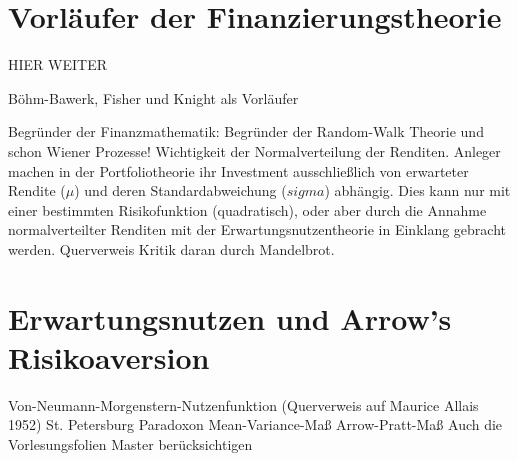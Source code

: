 \section{Vorläufer der Finanzierungstheorie}
\label{FisherundKnight}

HIER WEITER

Böhm-Bawerk, Fisher und Knight als Vorläufer

Begründer der Finanzmathematik: \textcite{Bachelier1900} Begründer der Random-Walk Theorie und schon Wiener Prozesse! 
Wichtigkeit der Normalverteilung der Renditen. Anleger machen in der Portfoliotheorie ihr Investment ausschließlich von erwarteter Rendite ($\mu$) und deren Standardabweichung ($sigma$) abhängig. Dies kann nur mit einer bestimmten Risikofunktion (quadratisch), oder aber durch die Annahme normalverteilter Renditen mit der Erwartungsnutzentheorie in Einklang gebracht werden. Querverweis Kritik daran durch Mandelbrot.


\section{Erwartungsnutzen und Arrow's Risikoaversion}
\label{Erwartungsnutzen}
Von-Neumann-Morgenstern-Nutzenfunktion (Querverweis auf Maurice Allais 1952)
St. Petersburg Paradoxon
Mean-Variance-Maß Arrow-Pratt-Maß
Auch die Vorlesungsfolien Master berücksichtigen



